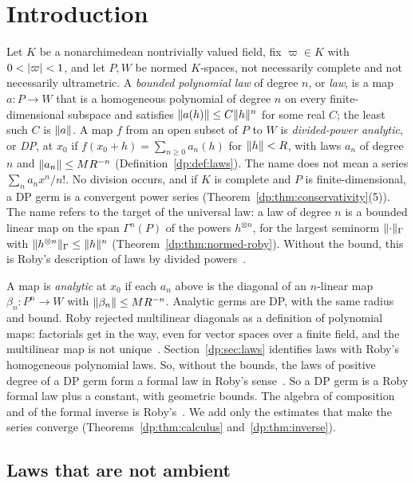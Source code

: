 \section{Introduction}\label{dp:sec:intro}

Let $K$ be a nonarchimedean nontrivially valued field, fix $\varpi\in K$ with $0<\lvert \varpi\rvert<1$, and let $P,W$ be normed $K$-spaces, not necessarily complete and not necessarily ultrametric. A \emph{bounded polynomial law} of degree $n$, or \emph{law}, is a map $a\colon P\to W$ that is a homogeneous polynomial of degree $n$ on every finite-dimensional subspace and satisfies $\lVert a(h)\rVert\le C\lVert h\rVert^n$ for some real $C$; the least such $C$ is $\lVert a\rVert$. A map $f$ from an open subset of $P$ to $W$ is \emph{divided-power analytic}, or \emph{DP}, at $x_0$ if $f(x_0+h)=\sum_{n\ge0}a_n(h)$ for $\lVert h\rVert<R$, with laws $a_n$ of degree $n$ and $\lVert a_n\rVert\le MR^{-n}$ (Definition~\ref{dp:def:laws}). The name does not mean a series $\sum_na_nx^n/n!$. No division occurs, and if $K$ is complete and $P$ is finite-dimensional, a DP germ is a convergent power series (Theorem~\ref{dp:thm:conservativity}(5)). The name refers to the target of the universal law: a law of degree $n$ is a bounded linear map on the span $\Gamma^n(P)$ of the powers $h^{\otimes n}$, for the largest seminorm $\lVert \cdot\rVert_\Gamma$ with $\lVert h^{\otimes n}\rVert_\Gamma\le\lVert h\rVert^n$ (Theorem~\ref{dp:thm:normed-roby}). Without the bound, this is Roby's description of laws by divided powers~\cite[Th.~IV.1, Prop.~IV.5]{Ro}.

A map is \emph{analytic} at $x_0$ if each $a_n$ above is the diagonal of an $n$-linear map $\beta_n\colon P^n\to W$ with $\lVert \beta_n\rVert\le MR^{-n}$. Analytic germs are DP, with the same radius and bound. Roby rejected multilinear diagonals as a definition of polynomial maps: factorials get in the way, even for vector spaces over a finite field, and the multilinear map is not unique~\cite[p.~214]{Ro}. Section~\ref{dp:sec:laws} identifies laws with Roby's homogeneous polynomial laws. So, without the bounds, the laws of positive degree of a DP germ form a formal law in Roby's sense~\cite[Th.~VI.1, Th.~VI.2]{Ro}. So a DP germ is a Roby formal law plus a constant, with geometric bounds. The algebra of composition and of the formal inverse is Roby's~\cite[VI~\S8, Prop.~VI.6, Cor.; Th.~VI.3, Prop.~VI.8]{Ro}. We add only the estimates that make the series converge (Theorems~\ref{dp:thm:calculus} and~\ref{dp:thm:inverse}).

\subsection*{Laws that are not ambient}

